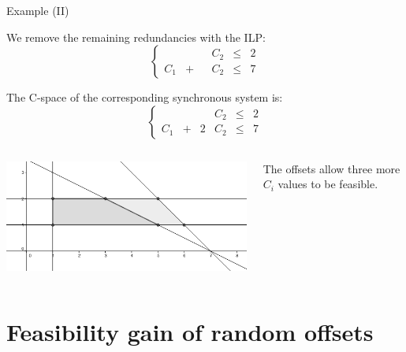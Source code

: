 \documentclass{beamer}
\begin{document}
    \begin{frame}{Example (II)}

    We remove the remaining redundancies with the ILP:
    $$
        \left\{
            \begin{array}{cccccc}
                & & & C_2 & \leqslant & 2 \\
                C_1 & + & & C_2 & \leqslant & 7
            \end{array}
        \right.
    $$

    The C-space of the corresponding synchronous system is:
    $$
    \left\{
      \begin{array}{cccccc}
        & & & C_2 & \leqslant & 2 \\
        C_1 & + & 2 & C_2 & \leqslant & 7
      \end{array}
    \right.
    $$

    \begin{columns}[c]


    \includegraphics[width=\textwidth]{figs/cspace_example.png}


    The offsets allow three more $C_i$ values to be feasible.

    \end{columns}

    \end{frame}

\section{Feasibility gain of random offsets}

    \begin{frame}
    \end{frame}
\end{document}
